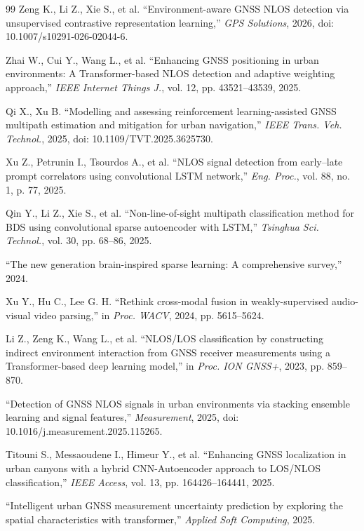 \begin{thebibliography}{99}
 Zeng K., Li Z., Xie S., et al. ``Environment-aware GNSS NLOS detection via unsupervised contrastive representation learning,'' \textit{GPS Solutions}, 2026, doi: 10.1007/s10291-026-02044-6.

 Zhai W., Cui Y., Wang L., et al. ``Enhancing GNSS positioning in urban environments: A Transformer-based NLOS detection and adaptive weighting approach,'' \textit{IEEE Internet Things J.}, vol. 12, pp. 43521--43539, 2025.

 Qi X., Xu B. ``Modelling and assessing reinforcement learning-assisted GNSS multipath estimation and mitigation for urban navigation,'' \textit{IEEE Trans. Veh. Technol.}, 2025, doi: 10.1109/TVT.2025.3625730.

 Xu Z., Petrunin I., Tsourdos A., et al. ``NLOS signal detection from early--late prompt correlators using convolutional LSTM network,'' \textit{Eng. Proc.}, vol. 88, no. 1, p. 77, 2025.

 Qin Y., Li Z., Xie S., et al. ``Non-line-of-sight multipath classification method for BDS using convolutional sparse autoencoder with LSTM,'' \textit{Tsinghua Sci. Technol.}, vol. 30, pp. 68--86, 2025.

 ``The new generation brain-inspired sparse learning: A comprehensive survey,'' 2024.

 Xu Y., Hu C., Lee G. H. ``Rethink cross-modal fusion in weakly-supervised audio-visual video parsing,'' in \textit{Proc. WACV}, 2024, pp. 5615--5624.

 Li Z., Zeng K., Wang L., et al. ``NLOS/LOS classification by constructing indirect environment interaction from GNSS receiver measurements using a Transformer-based deep learning model,'' in \textit{Proc. ION GNSS+}, 2023, pp. 859--870.

 ``Detection of GNSS NLOS signals in urban environments via stacking ensemble learning and signal features,'' \textit{Measurement}, 2025, doi: 10.1016/j.measurement.2025.115265.

 Titouni S., Messaoudene I., Himeur Y., et al. ``Enhancing GNSS localization in urban canyons with a hybrid CNN-Autoencoder approach to LOS/NLOS classification,'' \textit{IEEE Access}, vol. 13, pp. 164426--164441, 2025.

 ``Intelligent urban GNSS measurement uncertainty prediction by exploring the spatial characteristics with transformer,'' \textit{Applied Soft Computing}, 2025.


\end{thebibliography}

